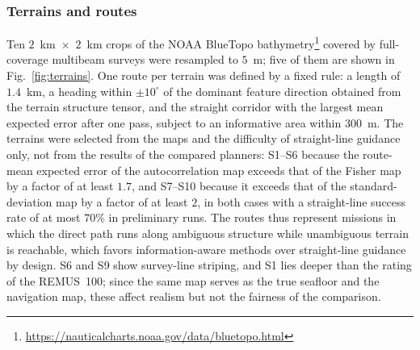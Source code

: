 \documentclass[letterpaper, 10 pt, journal, twoside]{IEEEtran}
\begin{document}
\subsubsection{Terrains and routes}
Ten $2$~km~$\times$~$2$~km crops of the NOAA BlueTopo bathymetry\footnote{\url{https://nauticalcharts.noaa.gov/data/bluetopo.html}} covered by full-coverage multibeam surveys were resampled to $5$~m; five of them are shown in Fig.~\ref{fig:terrains}. One route per terrain was defined by a fixed rule: a length of $1.4$~km, a heading within $\pm 10^\circ$ of the dominant feature direction obtained from the terrain structure tensor, and the straight corridor with the largest mean expected error after one pass, subject to an informative area within $300$~m. The terrains were selected from the maps and the difficulty of straight-line guidance only, not from the results of the compared planners: S1--S6 because the route-mean expected error of the autocorrelation map exceeds that of the Fisher map by a factor of at least $1.7$, and S7--S10 because it exceeds that of the standard-deviation map by a factor of at least $2$, in both cases with a straight-line success rate of at most $70\%$ in preliminary runs. The routes thus represent missions in which the direct path runs along ambiguous structure while unambiguous terrain is reachable, which favors information-aware methods over straight-line guidance by design. S6 and S9 show survey-line striping, and S1 lies deeper than the rating of the REMUS~100; since the same map serves as the true seafloor and the navigation map, these affect realism but not the fairness of the comparison.
\end{document}
